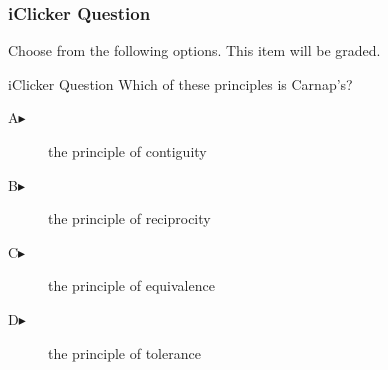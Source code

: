 \begin{frame}
  \frametitle{iClicker Question}
Choose from the following options. This item will be graded.
\begin{block}{iClicker Question}
Which of these principles is Carnap's?
\end{block}
\begin{description}
\item[A\hspace{.2in}$\blacktriangleright$] the principle of contiguity
\item[B\hspace{.2in}$\blacktriangleright$] the principle of reciprocity
\item[C\hspace{.2in}$\blacktriangleright$] the principle of equivalence
\item[D\hspace{.2in}$\blacktriangleright$] the principle of tolerance
\end{description}
\end{frame}
